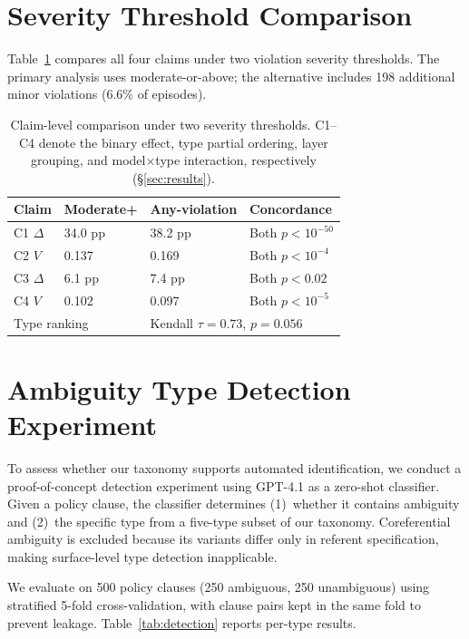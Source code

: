 \section{Severity Threshold Comparison}
\label{app:severity}

Table~\ref{tab:severity_comparison} compares all four claims under two violation severity thresholds. The primary analysis uses moderate-or-above; the alternative includes 198 additional minor violations (6.6\% of episodes).

\begin{table}[!ht]
\centering
\small
\caption{Claim-level comparison under two severity thresholds. C1--C4 denote the binary effect, type partial ordering, layer grouping, and model$\times$type interaction, respectively (\S\ref{sec:results}).}
\label{tab:severity_comparison}
\begin{tabular}{llll}
\toprule
Claim & Moderate+ & Any-violation & Concordance \\
\midrule
C1 $\Delta$ & 34.0 pp & 38.2 pp & Both $p < 10^{-50}$ \\
C2 $V$ & 0.137 & 0.169 & Both $p < 10^{-4}$ \\
C3 $\Delta$ & 6.1 pp & 7.4 pp & Both $p < 0.02$ \\
C4 $V$ & 0.102 & 0.097 & Both $p < 10^{-5}$ \\
\midrule
\multicolumn{2}{l}{Type ranking} & \multicolumn{2}{l}{Kendall $\tau = 0.73$, $p = 0.056$} \\
\bottomrule
\end{tabular}
\end{table}

\section{Ambiguity Type Detection Experiment}
\label{app:detection}

To assess whether our taxonomy supports automated identification, we conduct a proof-of-concept detection experiment using GPT-4.1 as a zero-shot classifier. Given a policy clause, the classifier determines (1)~whether it contains ambiguity and (2)~the specific type from a five-type subset of our taxonomy. Coreferential ambiguity is excluded because its variants differ only in referent specification, making surface-level type detection inapplicable.

We evaluate on 500 policy clauses (250 ambiguous, 250 unambiguous) using stratified 5-fold cross-validation, with clause pairs kept in the same fold to prevent leakage. Table~\ref{tab:detection} reports per-type results.

